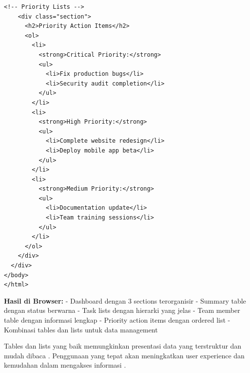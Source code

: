 \begin{lstlisting}[caption={Dashboard dengan Tables dan Lists}, basicstyle=\ttfamily\small, frame=single]
    <!-- Priority Lists -->
    <div class="section">
      <h2>Priority Action Items</h2>
      <ol>
        <li>
          <strong>Critical Priority:</strong>
          <ul>
            <li>Fix production bugs</li>
            <li>Security audit completion</li>
          </ul>
        </li>
        <li>
          <strong>High Priority:</strong>
          <ul>
            <li>Complete website redesign</li>
            <li>Deploy mobile app beta</li>
          </ul>
        </li>
        <li>
          <strong>Medium Priority:</strong>
          <ul>
            <li>Documentation update</li>
            <li>Team training sessions</li>
          </ul>
        </li>
      </ol>
    </div>
  </div>
</body>
</html>
\end{lstlisting}

\textbf{Hasil di Browser:}
- Dashboard dengan 3 sections terorganisir
- Summary table dengan status berwarna
- Task lists dengan hierarki yang jelas
- Team member table dengan informasi lengkap
- Priority action items dengan ordered list
- Kombinasi tables dan lists untuk data management

Tables dan lists yang baik memungkinkan presentasi data yang terstruktur dan mudah dibaca \cite{w3schools-html}. Penggunaan yang tepat akan meningkatkan user experience dan kemudahan dalam mengakses informasi \cite{mdn-html}.
